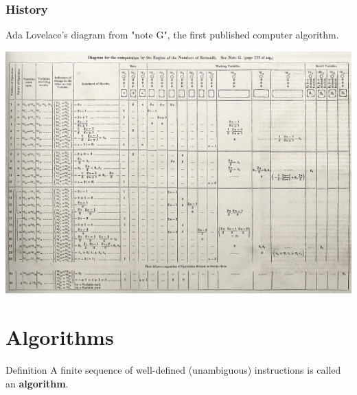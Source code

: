 \documentclass{beamer}
\newcommand{\bfemph}[1]{\textbf{#1}}
\renewcommand{\emph}[1]{\bfemph{#1}}
\begin{document}
\begin{frame}
    \frametitle{History}
    Ada Lovelace's diagram from "note G", the first published computer algorithm.
    
    \bigskip
    
    \centerline{\includegraphics[scale=0.2]{figures/ada_diagram.jpg}}
    
\end{frame}

\section{Algorithms}
\begin{frame}

    \begin{block}{Definition}
        A finite sequence of well-defined (unambiguous) instructions is called an \emph{algorithm}.
    \end{block}

\end{frame}
\end{document}
